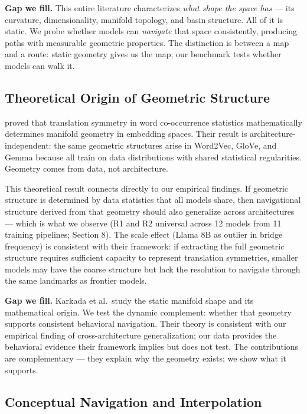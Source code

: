 \textbf{Gap we fill.} This entire literature characterizes \emph{what shape the space has} --- its curvature, dimensionality, manifold topology, and basin structure. All of it is static. We probe whether models can \emph{navigate} that space consistently, producing paths with measurable geometric properties. The distinction is between a map and a route: static geometry gives us the map; our benchmark tests whether models can walk it.

\subsection{Theoretical Origin of Geometric Structure}\label{theoretical-origin-of-geometric-structure}

\citet{karkada2025translation} proved that translation symmetry in word co-occurrence statistics mathematically determines manifold geometry in embedding spaces. Their result is architecture-independent: the same geometric structures arise in Word2Vec, GloVe, and Gemma because all train on data distributions with shared statistical regularities. Geometry comes from data, not architecture.

This theoretical result connects directly to our empirical findings. If geometric structure is determined by data statistics that all models share, then navigational structure derived from that geometry should also generalize across architectures --- which is what we observe (R1 and R2 universal across 12 models from 11 training pipelines; Section 8). The scale effect (Llama 8B as outlier in bridge frequency) is consistent with their framework: if extracting the full geometric structure requires sufficient capacity to represent translation symmetries, smaller models may have the coarse structure but lack the resolution to navigate through the same landmarks as frontier models.

\textbf{Gap we fill.} Karkada et al.~study the static manifold shape and its mathematical origin. We test the dynamic complement: whether that geometry supports consistent behavioral navigation. Their theory is consistent with our empirical finding of cross-architecture generalization; our data provides the behavioral evidence their framework implies but does not test. The contributions are complementary --- they explain why the geometry exists; we show what it supports.

\subsection{Conceptual Navigation and Interpolation}\label{conceptual-navigation-and-interpolation}

